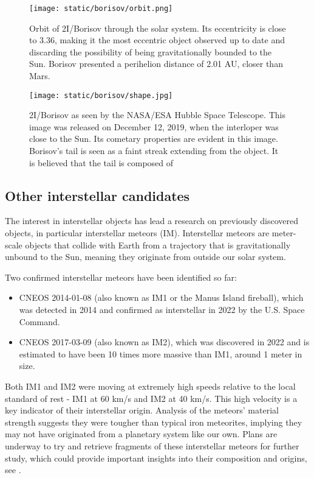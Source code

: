 \begin{figure}[H]
  \centering
  \texttt{[image: static/borisov/orbit.png]}
  \caption[Orbit of 2I/Borisov through the solar system]{
    Orbit of 2I/Borisov through the solar system. Its eccentricity is
    close to 3.36, making it the most eccentric object observed up to date
    and discarding the possibility of being gravitationally bounded to the Sun.
    Borisov presented a perihelion distance of 2.01 AU, closer than Mars.
  }
  \label{fig:borisov_orbit}
\end{figure}

\begin{figure}[H]
  \centering
  \texttt{[image: static/borisov/shape.jpg]}
\caption[Borisov as seen by the NASA/ESA Hubble Space Telescope]{
  2I/Borisov as seen by the NASA/ESA Hubble Space Telescope. This image was
  released on December 12, 2019, when the interloper was close to the Sun. Its
  cometary properties are evident in this image. Borisov's tail is seen as a
faint streak extending from the object. It is believed that the tail is composed
of 
  }
  \label{fig:borisov_shape}
\end{figure}

\subsection{Other interstellar candidates}

The interest in interstellar objects has lead a research on previously
discovered objects, in particular interstellar meteors (IM). Interstellar
meteors are meter-scale objects that collide with Earth from a trajectory that
is gravitationally unbound to the Sun, meaning they originate from outside our
solar system. 

Two confirmed interstellar meteors have been identified so far:

\begin{itemize}
  \item CNEOS 2014-01-08 (also known as IM1 or the Manus Island fireball), which
    was detected in 2014 and confirmed as interstellar in 2022 by the U.S. Space
    Command.
  \item CNEOS 2017-03-09 (also known as IM2), which was discovered in 2022 and is
    estimated to have been 10 times more massive than IM1, around 1 meter in
    size.
\end{itemize}

Both IM1 and IM2 were moving at extremely high speeds relative to the local
standard of rest - IM1 at 60 km/s and IM2 at 40 km/s. This high velocity is a
key indicator of their interstellar origin. Analysis of the meteors' material
strength suggests they were tougher than typical iron meteorites, implying they
may not have originated from a planetary system like our own. Plans are underway
to try and retrieve fragments of these interstellar meteors for further study,
which could provide important insights into their composition and origins, see
\cite{siraj2022discovery}.
